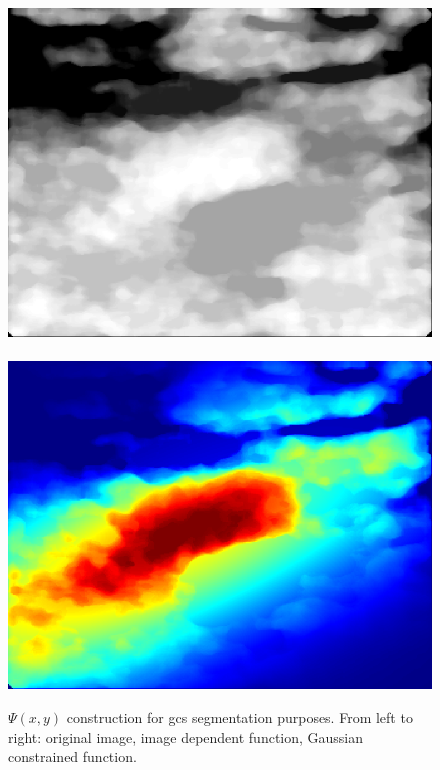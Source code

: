 \begin{frame}
\begin{figure}[Htbp]
\includegraphics[trim= 0 5 0 10, clip,height=.24\textwidth]{mscThesis/SonoProcessed.png}~ 
\includegraphics[trim= 0 5 0 10, clip,height=.24\textwidth]{mscThesis/SonoPsi.png}
\caption{{\scriptsize {} $\Psi(x,y)$ construction for \acf{gcs} segmentation purposes. From left to right: original image, image dependent function, Gaussian constrained function. }}
\end{figure}
\end{frame}


